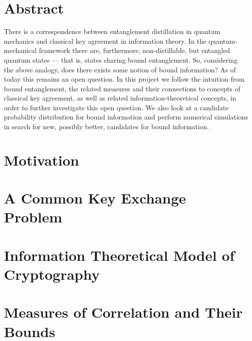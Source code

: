 \documentclass[titlepage]{report}
\theoremstyle{remark}
\begin{document}


\chapter*{Abstract}
There is a correspondence between entanglement distillation in quantum mechanics and classical key agreement in information theory. 
In the quantum-mechanical framework there are, furthermore, non-distillable, but entangled quantum states --- that is, states sharing bound entanglement. 
So, considering the above analogy, does there exists some notion of bound information? As of today this remains an open question.
In this project we follow the intuition from bound entanglement, the related measures and their connections to concepts of classical key agreement, as well as related information-theoretical concepts, in order to further investigate this open question.
We also look at a candidate probability distribution for bound information and perform numerical simulations in search for new, possibly better, candidates for bound information.


\tableofcontents

%

\chapter{Motivation}

		
 \chapter{A Common Key Exchange Problem}
 
\chapter{Information Theoretical Model of Cryptography}

\chapter{Measures of Correlation and Their Bounds}

\end{document}
